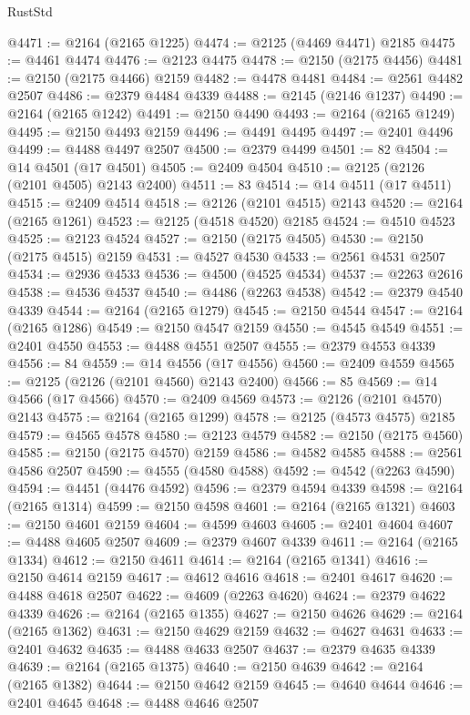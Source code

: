 \begin{lexlean}{RustStd}
\begin{coremodule}
@4471 := @2164 (@2165 @1225)
@4474 := @2125 (@4469 @4471) @2185
@4475 := @4461 @4474
@4476 := @2123 @4475
@4478 := @2150 (@2175 @4456)
@4481 := @2150 (@2175 @4466) @2159
@4482 := @4478 @4481
@4484 := @2561 @4482 @2507
@4486 := @2379 @4484 @4339
@4488 := @2145 (@2146 @1237)
@4490 := @2164 (@2165 @1242)
@4491 := @2150 @4490
@4493 := @2164 (@2165 @1249)
@4495 := @2150 @4493 @2159
@4496 := @4491 @4495
@4497 := @2401 @4496
@4499 := @4488 @4497 @2507
@4500 := @2379 @4499
@4501 := 82
@4504 := @14 @4501 (@17 @4501)
@4505 := @2409 @4504
@4510 := @2125 (@2126 (@2101 @4505) @2143 @2400)
@4511 := 83
@4514 := @14 @4511 (@17 @4511)
@4515 := @2409 @4514
@4518 := @2126 (@2101 @4515) @2143
@4520 := @2164 (@2165 @1261)
@4523 := @2125 (@4518 @4520) @2185
@4524 := @4510 @4523
@4525 := @2123 @4524
@4527 := @2150 (@2175 @4505)
@4530 := @2150 (@2175 @4515) @2159
@4531 := @4527 @4530
@4533 := @2561 @4531 @2507
@4534 := @2936 @4533
@4536 := @4500 (@4525 @4534)
@4537 := @2263 @2616
@4538 := @4536 @4537
@4540 := @4486 (@2263 @4538)
@4542 := @2379 @4540 @4339
@4544 := @2164 (@2165 @1279)
@4545 := @2150 @4544
@4547 := @2164 (@2165 @1286)
@4549 := @2150 @4547 @2159
@4550 := @4545 @4549
@4551 := @2401 @4550
@4553 := @4488 @4551 @2507
@4555 := @2379 @4553 @4339
@4556 := 84
@4559 := @14 @4556 (@17 @4556)
@4560 := @2409 @4559
@4565 := @2125 (@2126 (@2101 @4560) @2143 @2400)
@4566 := 85
@4569 := @14 @4566 (@17 @4566)
@4570 := @2409 @4569
@4573 := @2126 (@2101 @4570) @2143
@4575 := @2164 (@2165 @1299)
@4578 := @2125 (@4573 @4575) @2185
@4579 := @4565 @4578
@4580 := @2123 @4579
@4582 := @2150 (@2175 @4560)
@4585 := @2150 (@2175 @4570) @2159
@4586 := @4582 @4585
@4588 := @2561 @4586 @2507
@4590 := @4555 (@4580 @4588)
@4592 := @4542 (@2263 @4590)
@4594 := @4451 (@4476 @4592)
@4596 := @2379 @4594 @4339
@4598 := @2164 (@2165 @1314)
@4599 := @2150 @4598
@4601 := @2164 (@2165 @1321)
@4603 := @2150 @4601 @2159
@4604 := @4599 @4603
@4605 := @2401 @4604
@4607 := @4488 @4605 @2507
@4609 := @2379 @4607 @4339
@4611 := @2164 (@2165 @1334)
@4612 := @2150 @4611
@4614 := @2164 (@2165 @1341)
@4616 := @2150 @4614 @2159
@4617 := @4612 @4616
@4618 := @2401 @4617
@4620 := @4488 @4618 @2507
@4622 := @4609 (@2263 @4620)
@4624 := @2379 @4622 @4339
@4626 := @2164 (@2165 @1355)
@4627 := @2150 @4626
@4629 := @2164 (@2165 @1362)
@4631 := @2150 @4629 @2159
@4632 := @4627 @4631
@4633 := @2401 @4632
@4635 := @4488 @4633 @2507
@4637 := @2379 @4635 @4339
@4639 := @2164 (@2165 @1375)
@4640 := @2150 @4639
@4642 := @2164 (@2165 @1382)
@4644 := @2150 @4642 @2159
@4645 := @4640 @4644
@4646 := @2401 @4645
@4648 := @4488 @4646 @2507

\end{coremodule}
\end{lexlean}
